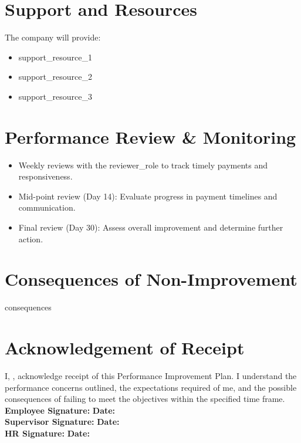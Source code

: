 \documentclass[a4paper,12pt]{article}
\begin{document}
\section*{Support and Resources}
The company will provide:
\begin{itemize}
    \item {{support_resource_1}}
    \item {{support_resource_2}}
    \item {{support_resource_3}}
\end{itemize}

\section*{Performance Review \& Monitoring}
\begin{itemize}
    \item Weekly reviews with the {{reviewer_role}} to track timely payments and responsiveness.
    \item Mid-point review (Day 14): Evaluate progress in payment timelines and communication.
    \item Final review (Day 30): Assess overall improvement and determine further action.
\end{itemize}

\section*{Consequences of Non-Improvement}
{{consequences}}

\section*{Acknowledgement of Receipt}
I, \underline{\hspace{3cm}}, acknowledge receipt of this Performance Improvement Plan. I understand the performance concerns outlined, the expectations required of me, and the possible consequences of failing to meet the objectives within the specified time frame. \\
\vspace{0.5cm}
\textbf{Employee Signature:} \underline{\hspace{5cm}} \textbf{Date:} \underline{\hspace{3cm}} \\
\textbf{Supervisor Signature:} \underline{\hspace{5cm}} \textbf{Date:} \underline{\hspace{3cm}} \\
\textbf{HR Signature:} \underline{\hspace{5cm}} \textbf{Date:} \underline{\hspace{3cm}}
\end{document}
